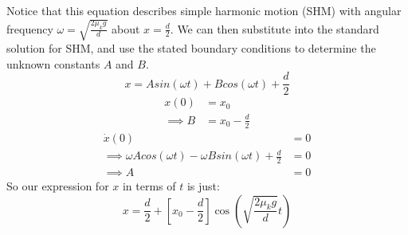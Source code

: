 \documentclass{article}
\begin{document}
Notice that this equation describes simple harmonic motion (SHM) with angular frequency $\omega = \sqrt{\frac{2\mu_kg}{d}}$ about $x=\frac{d}{2}$. We can then substitute into the standard solution for SHM, and use the stated boundary conditions to determine the unknown constants $A$ and $B$.
\begin{equation}
    x = A sin(\omega t) + B cos(\omega t) + \frac{d}{2}
\end{equation}
\begin{align}
    x(0) &= x_0\\
    \implies B &= x_0 - \frac{d}{2}
\end{align}
\begin{align}
    \dot{x}(0) &= 0\\
    \implies \omega A cos(\omega t) - \omega B sin(\omega t) + \frac{d}{2} &= 0\\
    \implies A &= 0
\end{align}
So our expression for $x$ in terms of $t$ is just:
\begin{equation}
    x = \frac{d}{2} + \left[ x_0 - \frac{d}{2} \right] \cos \left( \sqrt{\frac{2\mu_kg}{d}} t \right)
\end{equation}
\end{document}
